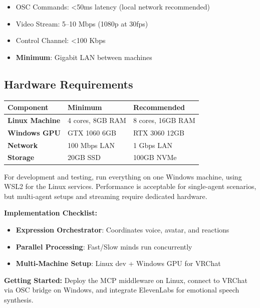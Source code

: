 \documentclass[11pt,letterpaper]{article}
\renewcommand{\arraystretch}{1.3}
\begin{document}
\begin{infobox}
\begin{itemize}
  \item OSC Commands: <50ms latency (local network recommended)
  \item Video Stream: 5--10 Mbps (1080p at 30fps)
  \item Control Channel: <100 Kbps
  \item \textbf{Minimum}: Gigabit LAN between machines
\end{itemize}
\end{infobox}

\subsection{Hardware Requirements}

\begin{center}
\renewcommand{\arraystretch}{1.3}
\begin{tabular}{@{}L{2.5cm}L{4.5cm}L{4.5cm}@{}}
\toprule
\textbf{Component} & \textbf{Minimum} & \textbf{Recommended} \\
\midrule
\textbf{Linux Machine} & 4 cores, 8GB RAM & 8 cores, 16GB RAM \\
\textbf{Windows GPU} & GTX 1060 6GB & RTX 3060 12GB \\
\textbf{Network} & 100 Mbps LAN & 1 Gbps LAN \\
\textbf{Storage} & 20GB SSD & 100GB NVMe \\
\bottomrule
\end{tabular}
\end{center}

\begin{tipbox}
For development and testing, run everything on one Windows machine, using WSL2 for the Linux services. Performance is acceptable for single-agent scenarios, but multi-agent setups and streaming require dedicated hardware.
\end{tipbox}

\begin{tcolorbox}[
  enhanced,
  colback=vcprimary!5,
  colframe=vcprimary!50,
  boxrule=1pt,
  arc=6pt,
  left=12pt, right=12pt, top=10pt, bottom=10pt,
  title={\textcolor{white}{\sffamily\bfseries Part VI Summary: Integration Guide}},
  colbacktitle=vcprimary,
  partsummary
]
\small
\textbf{Implementation Checklist:}
\begin{itemize}[nosep, leftmargin=1.2em]
  \item \textbf{Expression Orchestrator}: Coordinates voice, avatar, and reactions
  \item \textbf{Parallel Processing}: Fast/Slow minds run concurrently
  \item \textbf{Multi-Machine Setup}: Linux dev + Windows GPU for VRChat
\end{itemize}

\vspace{0.5em}
\textcolor{coolgray}{\small\textbf{Getting Started:} Deploy the MCP middleware on Linux, connect to VRChat via OSC bridge on Windows, and integrate ElevenLabs for emotional speech synthesis.}
\end{tcolorbox}
\end{document}
